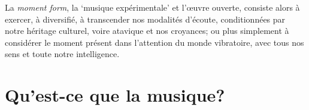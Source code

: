 \documentclass{article}
\begin{document}
La \textit{moment form}, la `musique expérimentale' et l'œuvre ouverte, consiste alors à exercer, à diversifié, à transcender nos modalités d'écoute, conditionnées par notre héritage culturel, voire atavique et nos croyances; ou plus simplement à considérer le moment présent dans l'attention du monde vibratoire, avec tous nos sens et toute notre intelligence.






%
%

%    
  

\section{Qu’est-ce que la musique?}
\end{document}
